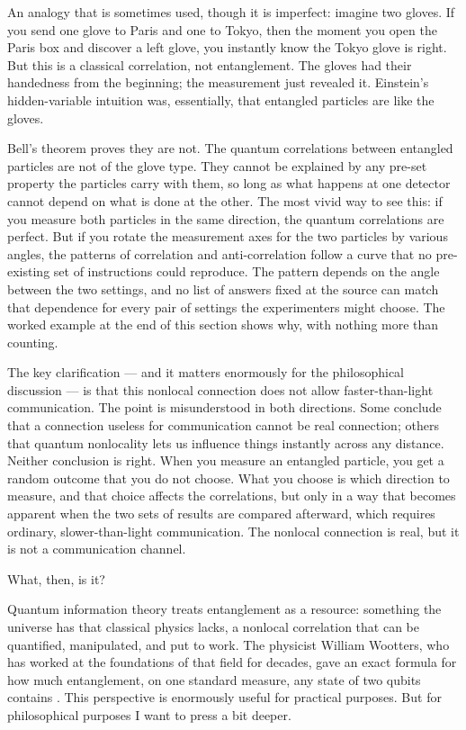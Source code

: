 An analogy that is sometimes used, though it is imperfect: imagine two gloves. If you send one glove to Paris and one to Tokyo, then the moment you open the Paris box and discover a left glove, you instantly know the Tokyo glove is right. But this is a classical correlation, not entanglement. The gloves had their handedness from the beginning; the measurement just revealed it. Einstein's hidden-variable intuition was, essentially, that entangled particles are like the gloves.

Bell's theorem proves they are not. The quantum correlations between entangled particles are not of the glove type. They cannot be explained by any pre-set property the particles carry with them, so long as what happens at one detector cannot depend on what is done at the other. The most vivid way to see this: if you measure both particles in the same direction, the quantum correlations are perfect. But if you rotate the measurement axes for the two particles by various angles, the patterns of correlation and anti-correlation follow a curve that no pre-existing set of instructions could reproduce. The pattern depends on the angle between the two settings, and no list of answers fixed at the source can match that dependence for every pair of settings the experimenters might choose. The worked example at the end of this section shows why, with nothing more than counting.

The key clarification --- and it matters enormously for the philosophical discussion --- is that this nonlocal connection does not allow faster-than-light communication. The point is misunderstood in both directions. Some conclude that a connection useless for communication cannot be real connection; others that quantum nonlocality lets us influence things instantly across any distance. Neither conclusion is right. When you measure an entangled particle, you get a random outcome that you do not choose. What you choose is which direction to measure, and that choice affects the correlations, but only in a way that becomes apparent when the two sets of results are compared afterward, which requires ordinary, slower-than-light communication. The nonlocal connection is real, but it is not a communication channel.

What, then, is it?

Quantum information theory treats entanglement as a resource: something the universe has that classical physics lacks, a nonlocal correlation that can be quantified, manipulated, and put to work. The physicist William Wootters, who has worked at the foundations of that field for decades, gave an exact formula for how much entanglement, on one standard measure, any state of two qubits contains \citep{Wootters1998}. This perspective is enormously useful for practical purposes. But for philosophical purposes I want to press a bit deeper.

